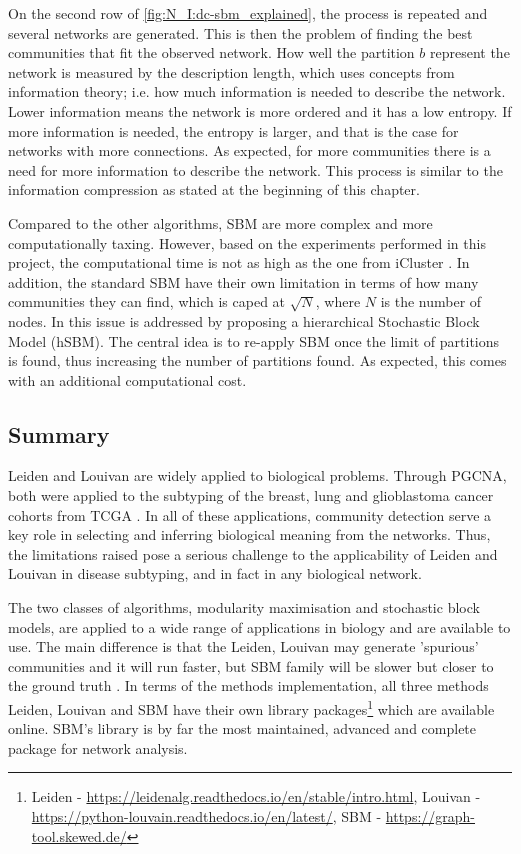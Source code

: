 On the second row of \cref{fig:N_I:dc-sbm_explained}, the process is repeated and several networks are generated. This is then the problem of finding the best communities that fit the observed network. How well the partition $b$ represent the network is measured by the description length, which uses concepts from information theory; i.e. how much information is needed to describe the network. Lower information means the network is more ordered and it has a low entropy. If more information is needed, the entropy is larger, and that is the case for networks with more connections. As expected, for more communities there is a need for more information to describe the network. This process is similar to the information compression as stated at the beginning of this chapter.

Compared to the other algorithms, SBM are more complex and more computationally taxing. However, based on the experiments performed in this project, the computational time is not as high as the one from iCluster \citep{Mo2013-zi}. In addition, the standard SBM \citep{Peixoto2019-fg, Peixoto2017-gc, Peixoto2017-ua, Karrer2011-si} have their own limitation in terms of how many communities they can find, which is caped at $\sqrt{N}$, where $N$ is the number of nodes. In \citet{Peixoto2014-yb} this issue is addressed by proposing a hierarchical Stochastic Block Model (hSBM). The central idea is to re-apply SBM once the limit of partitions is found, thus increasing the number of partitions found. As expected, this comes with an additional computational cost.

\subsection{Summary}


Leiden and Louivan are widely applied to biological problems. Through PGCNA, both were applied to the subtyping of the breast, lung and glioblastoma cancer cohorts from TCGA \citep{Tanner2023-wa, Care2019-ij}. In all of these applications, community detection serve a key role in selecting and inferring biological meaning from the networks. Thus, the limitations raised \citep{Peixoto2021-jx,Guimera2004-gv, Peixoto2023-rt} pose a serious challenge to the applicability of Leiden and Louivan in disease subtyping, and in fact in any biological network. 

The two classes of algorithms, modularity maximisation and stochastic block models, are applied to a wide range of applications in biology and are available to use. The main difference is that the Leiden, Louivan may generate 'spurious' communities and it will run faster, but SBM family will be slower but closer to the ground truth \citep{Peixoto2023-mw}. In terms of the methods implementation, all three methods Leiden, Louivan and SBM have their own library packages\footnote{Leiden - \url{https://leidenalg.readthedocs.io/en/stable/intro.html}, Louivan - \url{https://python-louvain.readthedocs.io/en/latest/}, SBM - \url{https://graph-tool.skewed.de/}} which are available online. 
SBM's library is by far the most maintained, advanced and complete package for network analysis.






